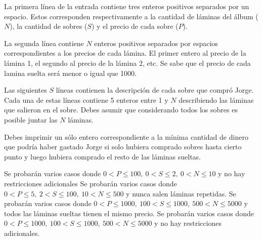 \documentclass{oci}
\begin{document}
\begin{inputDescription}
La primera línea de la entrada contiene tres enteros positivos separados por un
espacio. Estos corresponden respectivamente a la cantidad de láminas del álbum
($N$), la cantidad de sobres ($S$) y el precio de cada sobre ($P$).

La segunda línea contiene $N$ enteros positivos separados por espacios
correspondientes a los precios de cada lámina. El primer entero al precio de la
lámina 1, el segundo al precio de la lámina 2, etc. Se sabe que el precio de
cada lamina suelta será menor o igual que 1000.

Las siguientes $S$ líneas contienen la descripción de cada sobre que compró
Jorge. Cada una de estas líneas contiene 5 enteros entre 1 y $N$ describiendo
las láminas que salieron en el sobre. Debes asumir que considerando todos los
sobres es posible juntar las $N$ láminas. 
\end{inputDescription}

\begin{outputDescription}
Debes imprimir un sólo entero correspondiente a la mínima cantidad de dinero que
podría haber gastado Jorge si solo hubiera comprado sobres hasta cierto punto y
luego hubiera comprado el resto de las láminas sueltas.
\end{outputDescription}

\begin{scoreDescription}
   Se probarán varios casos donde
 $0 < P \leq 100,\ 0 < S \leq 2,\ 0 < N \leq 10$ y no hay restricciones adicionales
   Se probarán varios casos donde
 $0<P\leq 5,\ 2 < S \leq 100,\ 10 < N \leq 500$ y nunca salen láminas repetidas.
   Se probarán varios casos donde
$0<P\leq 1000,\ 100 < S \leq 1000,\ 500 < N \leq 5000$ y todos las láminas sueltas tienen el mismo precio.
   Se probarán varios casos donde
$0<P\leq 1000,\ 100 < S \leq 1000,\ 500<N\leq 5000$
y no hay restricciones adicionales.
\end{scoreDescription}

\begin{sampleDescription}
\end{sampleDescription}
\end{document}
